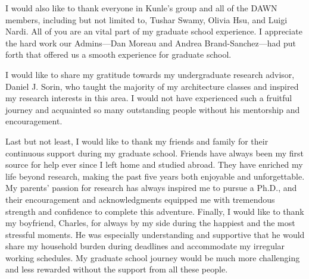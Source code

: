 I would also like to thank everyone in Kunle's group and all of the DAWN members, including but not limited to, 
Tushar Swamy, Olivia Hsu, and Luigi Nardi. 
All of you are an vital part of my graduate school experience.
I appreciate the hard work our Admins---Dan Moreau and Andrea Brand-Sanchez---had put forth that
offered us a smooth experience for graduate school.

I would like to share my gratitude towards my undergraduate research advisor, Daniel J. Sorin, who taught the
majority of my architecture classes and inspired my research interests in this area.
I would not have experienced such a fruitful journey and acquainted so many outstanding people
without his mentorship and encouragement.

Last but not least, I would like to thank my friends and family for their continuous support during my
graduate school. 
Friends have always been my first source for help ever since I left home and studied abroad.
They have enriched my life beyond research, making the past five years both enjoyable and
unforgettable.
My parents' passion for research has always inspired me to pursue a Ph.D., and their encouragement and
acknowledgments equipped me with tremendous strength and confidence to complete this adventure.
Finally, I would like to thank my boyfriend, Charles, for always by my side during the happiest and the most stressful moments. 
He was especially understanding and supportive that he would
share my household burden during deadlines and accommodate my irregular working schedules.
My graduate school journey would be much more challenging and less rewarded without the support from all these people.
